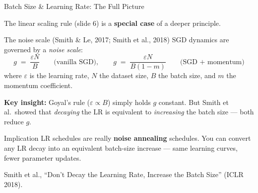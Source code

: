 \documentclass[aspectratio=169, 10pt]{beamer}
\newcommand{\keyword}[1]{\textcolor{ColumbiaBlue}{\textbf{#1}}}
\begin{document}
\begin{frame}{Batch Size \& Learning Rate: The Full Picture}

The linear scaling rule (slide 6) is a \keyword{special case} of a deeper principle.

\vspace{4pt}
\begin{block}{The noise scale (Smith \& Le, 2017; Smith et al., 2018)}
SGD dynamics are governed by a \emph{noise scale}:
\[
  g \;=\; \frac{\varepsilon N}{B}
  \qquad\text{(vanilla SGD)},
  \qquad
  g \;=\; \frac{\varepsilon N}{B(1-m)}
  \qquad\text{(SGD + momentum)}
\]
where $\varepsilon$ is the learning rate, $N$ the dataset size, $B$ the batch size, and $m$ the momentum coefficient.
\end{block}

\vspace{4pt}
\textbf{Key insight:} Goyal's rule ($\varepsilon \propto B$) simply holds $g$ constant. But Smith et al.\ showed that \emph{decaying} the LR is equivalent to \emph{increasing} the batch size --- both reduce $g$.

\vspace{4pt}
\begin{alertblock}{Implication}
LR schedules are really \textbf{noise annealing} schedules. You can convert any LR decay into an equivalent batch-size increase --- same learning curves, fewer parameter updates.
\end{alertblock}

\vspace{2pt}
{\scriptsize Smith et al., ``Don't Decay the Learning Rate, Increase the Batch Size'' (ICLR 2018).}

\end{frame}
\end{document}
